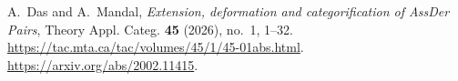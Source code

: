 A.~Das and A.~Mandal,
\emph{Extension, deformation and categorification of AssDer Pairs},
Theory Appl. Categ. \textbf{45} (2026), no.~1, 1--32.
\url{https://tac.mta.ca/tac/volumes/45/1/45-01abs.html}.
\url{https://arxiv.org/abs/2002.11415}.
